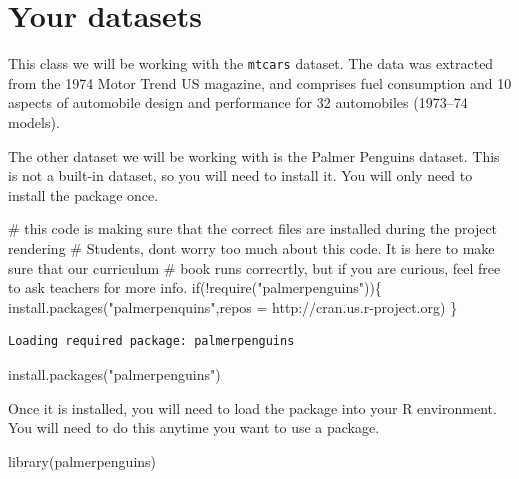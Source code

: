 \documentclass[
  letterpaper,
  DIV=11,
  numbers=noendperiod]{scrreprt}
\newenvironment{Shaded}{\begin{snugshade}}{\end{snugshade}}
\newcommand{\AttributeTok}[1]{\textcolor[rgb]{0.40,0.45,0.13}{#1}}
\newcommand{\CommentTok}[1]{\textcolor[rgb]{0.37,0.37,0.37}{#1}}
\newcommand{\ControlFlowTok}[1]{\textcolor[rgb]{0.00,0.23,0.31}{#1}}
\newcommand{\FunctionTok}[1]{\textcolor[rgb]{0.28,0.35,0.67}{#1}}
\newcommand{\NormalTok}[1]{\textcolor[rgb]{0.00,0.23,0.31}{#1}}
\newcommand{\SpecialCharTok}[1]{\textcolor[rgb]{0.37,0.37,0.37}{#1}}
\newcommand{\StringTok}[1]{\textcolor[rgb]{0.13,0.47,0.30}{#1}}
\begin{document}
\hypertarget{your-datasets}{%
\section{Your datasets}\label{your-datasets}}

This class we will be working with the \texttt{mtcars} dataset. The data
was extracted from the 1974 Motor Trend US magazine, and comprises fuel
consumption and 10 aspects of automobile design and performance for 32
automobiles (1973--74 models).

The other dataset we will be working with is the Palmer Penguins
dataset. This is not a built-in dataset, so you will need to install it.
You will only need to install the package once.

\begin{Shaded}
\begin{Highlighting}[]
\CommentTok{\# this code is making sure that the correct files are installed during the project rendering}
\CommentTok{\# Students, don\textquotesingle{}t worry too much about this code. It is here to make sure that our curriculum}
\CommentTok{\# book runs correcrtly, but if you are curious, feel free to ask teachers for more info. }
\ControlFlowTok{if}\NormalTok{(}\SpecialCharTok{!}\FunctionTok{require}\NormalTok{(}\StringTok{"palmerpenguins"}\NormalTok{))\{}
  \FunctionTok{install.packages}\NormalTok{(}\StringTok{"palmerpenquins"}\NormalTok{,}\AttributeTok{repos =} \StringTok{\textquotesingle{}http://cran.us.r{-}project.org\textquotesingle{}}\NormalTok{)}
\NormalTok{\}}
\end{Highlighting}
\end{Shaded}

\begin{verbatim}
Loading required package: palmerpenguins
\end{verbatim}

\begin{Shaded}
\begin{Highlighting}[]
\FunctionTok{install.packages}\NormalTok{(}\StringTok{"palmerpenguins"}\NormalTok{)}
\end{Highlighting}
\end{Shaded}

Once it is installed, you will need to load the package into your R
environment. You will need to do this anytime you want to use a package.

\begin{Shaded}
\begin{Highlighting}[]
\FunctionTok{library}\NormalTok{(palmerpenguins)}
\end{Highlighting}
\end{Shaded}
\end{document}
